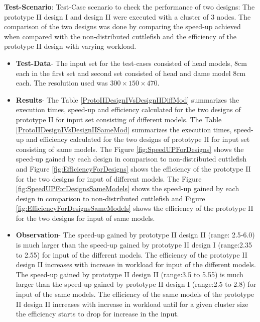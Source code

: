 \textbf{Test-Scenario}: Test-Case scenario to check the performance of two designs: The prototype II design I and design II were executed with a cluster of 3 nodes. The comparison of the two designs was done by comparing the speed-up achieved when compared with the non-distributed cuttlefish and the efficiency of the prototype II design with varying workload. 
\begin{itemize}
\item \textbf{Test-Data}- The input set for the test-cases consisted of head models, 8cm each in the first set and second set consisted of head and dame model 8cm each. The resolution used was \begin{math} 300 \times 150 \times 470 \end{math}. 
\item \textbf{Results}- The Table \ref{ProtoIIDesignIVsDesignIIDiffMod} summarizes the execution times, speed-up and efficiency calculated for the two designs of prototype II for input set consisting of different models. The Table \ref{ProtoIIDesignIVsDesignIISameMod} summarizes the execution times, speed-up and efficiency calculated for the two designs of prototype II for input set consisting of same models. The Figure \ref{fig:SpeedUPForDesigns} shows the speed-up gained by each design in comparison to non-distributed cuttlefish and Figure \ref{fig:EfficiencyForDesigns} shows the efficiency of the prototype II for the two designs for input of different models. The Figure \ref{fig:SpeedUPForDesignsSameModels} shows the speed-up gained by each design in comparison to non-distributed cuttlefish and Figure \ref{fig:EfficiencyForDesignsSameModels}  shows the efficiency of the prototype II for the two designs for input of same models.
\item \textbf{Observation}- The speed-up gained by prototype II design II (range: 2.5-6.0) is much larger than the speed-up gained by prototype II design I (range:2.35 to 2.55) for input of the different models. The efficiency of the prototype II design II increases with increase in workload for input of the different models. The speed-up gained by prototype II design II (range:3.5 to 5.55) is much larger than the speed-up gained by prototype II design I (range:2.5 to 2.8) for input of the same models. The efficiency of the same models of the prototype II design II increases with increase in workload until for a given cluster size the efficiency starts to drop for increase in the input.   
\end{itemize}


